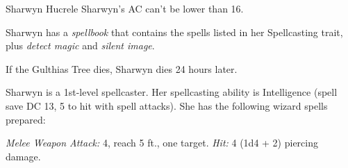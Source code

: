 \documentclass[10pt,a4paper,twoside,bg=print,twocolumn,openany,nodeprecatedcode]{dndbook}
\begin{document}
\begin{DndMonster}[float=t]{Sharwyn Hucrele}
\DndMonsterBasics[
armor-class = {16 (Barkskin trait)},
hit-points = {\DndDice{2d8 + 4}},
speed = {30 ft.}
]
\DndMonsterAbilityScores[
 str = 11,
 dex = 13,
 con = 14,
 int = 16,
 wis = 14,
 cha = 9
]
\DndMonsterDetails[
skills = {Arcana +5, Insight +4, Persuasion +1},
languages = {Common, Draconic, Goblin},
challenge = 1/2,
]
Sharwyn's AC can't be lower than 16.

Sharwyn has a \textit{spellbook} that contains the spells listed in her Spellcasting trait, plus \textit{detect magic} and \textit{silent image}.

If the Gulthias Tree dies, Sharwyn dies 24 hours later.

Sharwyn is a 1st-level spellcaster. Her spellcasting ability is Intelligence (spell save DC 13, 5 to hit with spell attacks). She has the following wizard spells prepared:
\begin{DndMonsterSpells}
\end{DndMonsterSpells}
\textsl{Melee Weapon Attack:} 4, reach 5 ft., one target. \textsl{Hit:} 4 (1d4 + 2) piercing damage.

\end{DndMonster}
\end{document}
